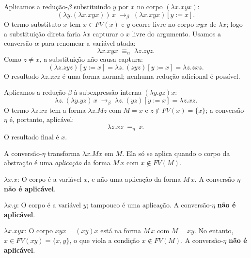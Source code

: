 \begin{solution}
\begin{Qlist}
\item[(a)] Aplicamos a redução-$\beta$ substituindo $y$ por $x$ no corpo $(\lambda x.xyx)$:
\[
    (\lambda y.(\lambda x.xyx))\,x \;\to_\beta\; (\lambda x.xyx)[y:=x].
\]
O termo substituto $x$ tem $x\in FV(x)$ e $y$ ocorre livre no corpo $xyx$ de $\lambda x$;
logo a substituição direta faria $\lambda x$ capturar o $x$ livre do argumento. Usamos a conversão-$\alpha$ para renomear a variável atada:
\[
    \lambda x.xyx \;\equiv_\alpha\; \lambda z.zyz.
\]
Como $z\neq x$, a substituição não causa captura:
\[
    (\lambda z.zyz)[y:=x] = \lambda z.\,(zyz)[y:=x] = \lambda z.zxz.
\]
O resultado $\lambda z.zxz$ é uma forma normal; nenhuma redução adicional é possível.

\item[(b)] Aplicamos a redução-$\beta$ à subexpressão interna $(\lambda y.yz)x$:
\[
    \lambda z.\,(\lambda y.yz)\,x
    \;\to_\beta\;
    \lambda z.\,(yz)[y:=x]
    = \lambda z.xz.
\]
O termo $\lambda z.xz$ tem a forma $\lambda z.Mz$ com $M=x$ e
$z\notin FV(x)=\{x\}$; a conversão-$\eta$ é, portanto, aplicável:
\[
    \lambda z.xz \;\equiv_\eta\; x.
\]
O resultado final é $x$.
\end{Qlist}
\end{solution}


\begin{solution}
A conversão-$\eta$ transforma $\lambda x.Mx$ em $M$. Ela só se aplica quando o
corpo da abstração é uma \emph{aplicação} da forma $M\,x$ com $x\notin FV(M)$.

\begin{Qlist}
\item[(a)] $\lambda x.x$: O corpo é a variável $x$, e não uma aplicação da forma
$M\,x$. A conversão-$\eta$ \textbf{não é aplicável}.

\item[(b)] $\lambda x.y$: O corpo é a variável $y$; tampouco é uma aplicação.
A conversão-$\eta$ \textbf{não é aplicável}.

\item[(c)] $\lambda x.xyx$: O corpo $xyx=(xy)x$ está na forma $M\,x$ com $M=xy$.
No entanto, $x\in FV(xy)=\{x,y\}$, o que viola a condição $x\notin FV(M)$.
A conversão-$\eta$ \textbf{não é aplicável}.
\end{Qlist}
\end{solution}

